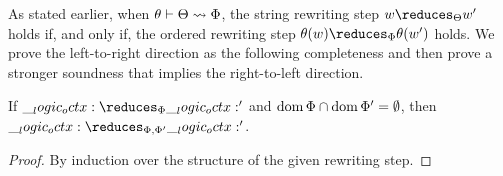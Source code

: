 As stated earlier, when $\theta \vdash \Theta \rightsquigarrow \Phi$, the string rewriting step $w \reduces_{\srsig} w'$ holds if, and only if, the ordered rewriting step $\theta(w) \reduces_{\orsig} \theta(w')$ holds.
We prove the left-to-right direction as the following completeness  and then prove a stronger soundness  that implies the right-to-left direction.


\begin{lemma}[Weakening]
  If $\octx \reduces_{\orsig} \octx'$ and $\operatorname{dom}{\Phi} \cap \operatorname{dom}{\Phi'} = \emptyset$, then $\octx \reduces_{\orsig, \orsig'} \octx'$.
\end{lemma}
\begin{proof}
  By induction over the structure of the given rewriting step.
\end{proof}

  
  
